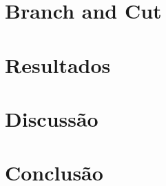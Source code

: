 \documentclass{article}
\begin{document}
	\section{Branch and Cut}
	
	\section{Resultados}
	
	\section{Discussão}
	
	\section{Conclusão}

	
\end{document}
